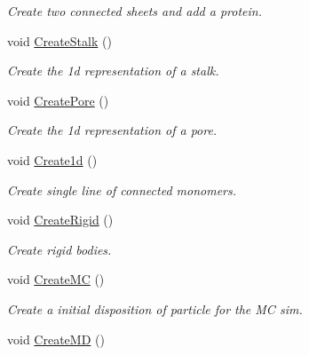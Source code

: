\begin{DoxyCompactItemize}
\begin{DoxyCompactList}\small\item\em Create two connected sheets and add a protein. \end{DoxyCompactList}\item 
void \hyperlink{classForces_afea6ddedbed181a50906556f6075257f}{Create\+Stalk} ()\hypertarget{classForces_afea6ddedbed181a50906556f6075257f}{}\label{classForces_afea6ddedbed181a50906556f6075257f}

\begin{DoxyCompactList}\small\item\em Create the 1d representation of a stalk. \end{DoxyCompactList}\item 
void \hyperlink{classForces_a20cdf4594381226c7b142df535f41893}{Create\+Pore} ()\hypertarget{classForces_a20cdf4594381226c7b142df535f41893}{}\label{classForces_a20cdf4594381226c7b142df535f41893}

\begin{DoxyCompactList}\small\item\em Create the 1d representation of a pore. \end{DoxyCompactList}\item 
void \hyperlink{classForces_a150658611a20b7185df56cc52412bc3f}{Create1d} ()\hypertarget{classForces_a150658611a20b7185df56cc52412bc3f}{}\label{classForces_a150658611a20b7185df56cc52412bc3f}

\begin{DoxyCompactList}\small\item\em Create single line of connected monomers. \end{DoxyCompactList}\item 
void \hyperlink{classForces_a655ba1e4004f501b750638d781f45c82}{Create\+Rigid} ()\hypertarget{classForces_a655ba1e4004f501b750638d781f45c82}{}\label{classForces_a655ba1e4004f501b750638d781f45c82}

\begin{DoxyCompactList}\small\item\em Create rigid bodies. \end{DoxyCompactList}\item 
void \hyperlink{classForces_a3f01e349d6a138fb20f9caa406c0d561}{Create\+MC} ()\hypertarget{classForces_a3f01e349d6a138fb20f9caa406c0d561}{}\label{classForces_a3f01e349d6a138fb20f9caa406c0d561}

\begin{DoxyCompactList}\small\item\em Create a initial disposition of particle for the MC sim. \end{DoxyCompactList}\item 
void \hyperlink{classForces_a344629f905b1cbbcb311a4d3e6ff8818}{Create\+MD} ()\hypertarget{classForces_a344629f905b1cbbcb311a4d3e6ff8818}{}\label{classForces_a344629f905b1cbbcb311a4d3e6ff8818}


\end{DoxyCompactItemize}
